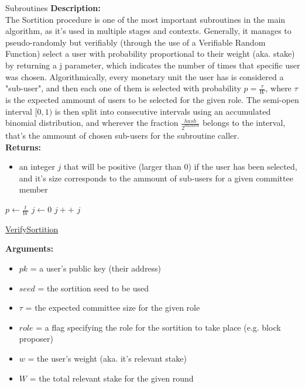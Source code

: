 \documentclass[10pt,a4paper]{article}
\begin{document}
\begin{section}{Subroutines}
\noindent \textbf{Description:}\\
The Sortition procedure is one of the most important subroutines in the main algorithm, as it's used in multiple stages and contexts.
Generally, it manages to pseudo-randomly but verifiably (through the use of a Verifiable Random Function) select a user with probability proportional
to their weight (aka. stake) by returning a j parameter, which indicates the number of times that specific user was chosen.
Algorithmically, every monetary unit the user has is considered a "sub-user", and then each one of them is selected with probability $p = \frac{\tau}{W}$,
where $\tau$ is the expected ammount of users to be selected for the given role.
The semi-open interval $[0,1)$ is then split into consecutive intervals using an accumulated binomial distribution, and wherever the fraction $\frac{hash}{2^{hashlen}}$
belongs to the interval, that's the ammount of chosen sub-users for the subroutine caller.\\

\noindent \textbf{Returns:}
\begin{itemize}
    \item an integer $j$ that will be positive (larger than 0) if the user has been selected, and it's size corresponds to the ammount
    of sub-users for a given committee member
  \end{itemize}

\begin{algorithm}[H]
    \begin{algorithmic}[H]
        \State $p \gets \frac{t}{W}$
        \State $j \gets 0$
        \While{$\frac{hash}{2^{hashlen}} \notin [\sum_{k=0}^jB(k;w,p), \sum_{k=0}^{j+1}B(k;w,p))$}
            \State $j++$
        \EndWhile
        \Return $j$
    \EndFunction
    \end{algorithmic}
    \caption{\underline{VerifySortition}}
\end{algorithm}

\noindent \textbf{Arguments:}
\begin{itemize}
    \item $pk$ = a user's public key (their address)
    \item $seed$ = the sortition seed to be used
    \item $\tau$ = the expected committee size for the given role
    \item $role$ = a flag specifying the role for the sortition to take place (e.g. block proposer)
    \item $w$ = the user's weight (aka. it's relevant stake)
    \item $W$ = the total relevant stake for the given round
  \end{itemize}


\end{section}
\end{document}
